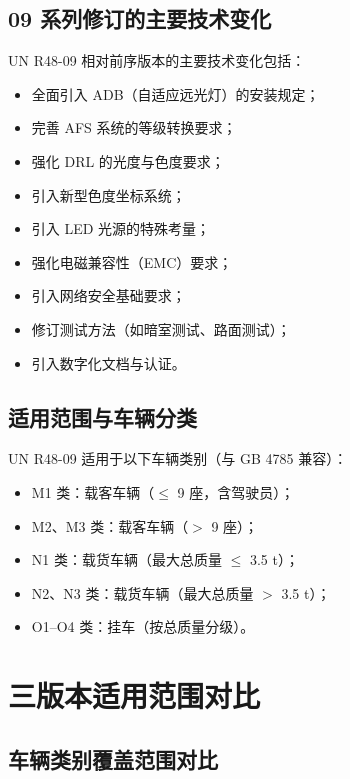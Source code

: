 \subsection{09 系列修订的主要技术变化}

UN R48-09 相对前序版本的主要技术变化包括：

\begin{itemize}[itemsep=0.3em]
    \item 全面引入 ADB（自适应远光灯）的安装规定；
    \item 完善 AFS 系统的等级转换要求；
    \item 强化 DRL 的光度与色度要求；
    \item 引入新型色度坐标系统；
    \item 引入 LED 光源的特殊考量；
    \item 强化电磁兼容性（EMC）要求；
    \item 引入网络安全基础要求；
    \item 修订测试方法（如暗室测试、路面测试）；
    \item 引入数字化文档与认证。
\end{itemize}

\subsection{适用范围与车辆分类}

UN R48-09 适用于以下车辆类别（与 GB 4785 兼容）：

\begin{itemize}[itemsep=0.2em]
    \item M1 类：载客车辆（$\le$ 9 座，含驾驶员）；
    \item M2、M3 类：载客车辆（$>$ 9 座）；
    \item N1 类：载货车辆（最大总质量 $\le$ 3.5 t）；
    \item N2、N3 类：载货车辆（最大总质量 $>$ 3.5 t）；
    \item O1--O4 类：挂车（按总质量分级）。
\end{itemize}

\section{三版本适用范围对比}

\subsection{车辆类别覆盖范围对比}

